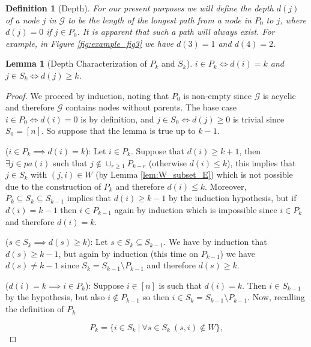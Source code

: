 \documentclass{statsoc}
\def\gcg{\mathcal{G}}  %
\newcommand{\pa}[1]{pa(#1)}  %
\newtheorem{lemma}{Lemma}
\newtheorem{definition}{Definition}
\begin{document}
\begin{definition}[Depth]
  For our present purposes we will define the \textit{depth} $d(j)$ of
  a node $j$ in $\gcg$ to be the length of the \textit{longest} path
  from a node in $P_0$ to $j$, where $d(j) = 0$ if $j \in P_0$.  It is
  apparent that such a path will always exist.  For example, in Figure
  \ref{fig:example_fig3} we have $d(3) = 1$ and $d(4) = 2$.
\end{definition}

\begin{lemma}[Depth Characterization of $P_k$ and $S_k$]
  \label{lem:depth_lemma}
  $i \in P_k \iff d(i) = k$ and $j \in S_k \iff d(j) \ge k$.
\end{lemma}
\begin{proof}
  We proceed by induction, noting that $P_0$ is non-empty since $\gcg$
  is acyclic and therefore $\gcg$ contains nodes without parents.  The
  base case $i \in P_0 \iff d(i) = 0$ is by definition, and
  $j \in S_0 \iff d(j) \ge 0$ is trivial since $S_0 = [n]$.  So
  suppose that the lemma is true up to $k - 1$.

  ($i \in P_k \implies d(i) = k$): Let $i \in P_k$.  Suppose that
  $d(i) \ge k + 1$, then $\exists j \in \pa{i}$ such that
  $j \not\in \cup_{r \ge 1}P_{k - r}$ (otherwise $d(i) \le k$), this
  implies that $j \in S_k$ with $(j, i) \in W$ (by Lemma
  \ref{lem:W_subset_E}) which is not possible due to the construction of
  $P_k$ and therefore $d(i) \le k$.  Moreover,
  $P_k \subseteq S_k \subseteq S_{k - 1}$ implies that
  $d(i) \ge k - 1$ by the induction hypothesis, but if $d(i) = k - 1$
  then $i \in P_{k - 1}$ again by induction which is impossible since
  $i \in P_k$ and therefore $d(i) = k$.

  ($s \in S_k \implies d(s) \ge k$): Let
  $s \in S_k \subseteq S_{k - 1}$.  We have by induction that
  $d(s) \ge k - 1$, but again by induction (this time on $P_{k - 1}$)
  we have $d(s) \ne k - 1$ since $S_k = S_{k - 1} \setminus P_{k - 1}$
  and therefore $d(s) \ge k$.

  ($d(i) = k \implies i \in P_k$): Suppose $i \in [n]$ is such that
  $d(i) = k$.  Then $i \in S_{k - 1}$ by the hypothesis, but also
  $i \not\in P_{k - 1}$ so then
  $i \in S_k = S_{k - 1} \setminus P_{k - 1}$.  Now, recalling the
  definition of $P_k$

  \begin{equation*}
    P_k = \{i \in S_k\ |\ \forall s \in S_k\ (s, i) \not\in W \},
  \end{equation*}


\end{proof}
\end{document}

